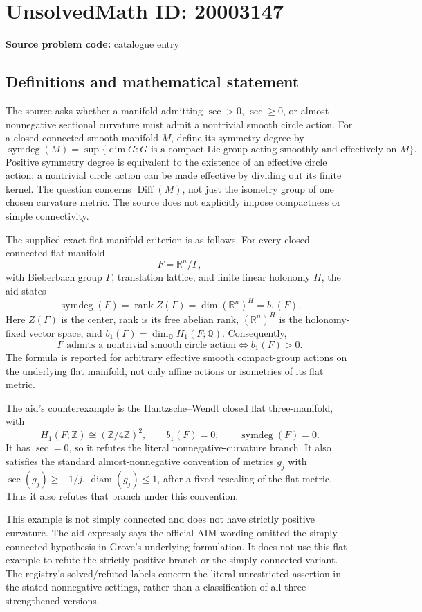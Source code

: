 \documentclass[11pt]{article}
\newcommand{\Z}{\mathbb{Z}}
\newcommand{\Q}{\mathbb{Q}}
\newcommand{\R}{\mathbb{R}}
\begin{document}
\section*{UnsolvedMath ID: 20003147}
\textbf{Source problem code:} catalogue entry
\subsection{Definitions and mathematical statement}
The source asks whether a manifold admitting \(\sec>0\), \(\sec\geq0\), or almost nonnegative sectional curvature must admit a nontrivial smooth circle action. For a closed connected smooth manifold \(M\), define its symmetry degree by
\[
 \operatorname{symdeg}(M)=\sup\{\dim G:G\text{ is a compact Lie group acting smoothly and effectively on }M\}.
\]
Positive symmetry degree is equivalent to the existence of an effective circle action; a nontrivial circle action can be made effective by dividing out its finite kernel. The question concerns \(\operatorname{Diff}(M)\), not just the isometry group of one chosen curvature metric. The source does not explicitly impose compactness or simple connectivity.

The supplied exact flat-manifold criterion is as follows. For every closed connected flat manifold
\[
 F=\R^n/\Gamma,
\]
with Bieberbach group \(\Gamma\), translation lattice, and finite linear holonomy \(H\), the aid states
\[
 \operatorname{symdeg}(F)
 =\operatorname{rank}Z(\Gamma)
 =\dim(\R^n)^H
 =b_1(F).
\]
Here \(Z(\Gamma)\) is the center, rank is its free abelian rank, \((\R^n)^H\) is the holonomy-fixed vector space, and \(b_1(F)=\dim_\Q H_1(F;\Q)\). Consequently,
\[
 F\text{ admits a nontrivial smooth circle action}
 \Longleftrightarrow b_1(F)>0.
\]
The formula is reported for arbitrary effective smooth compact-group actions on the underlying flat manifold, not only affine actions or isometries of its flat metric.

The aid's counterexample is the Hantzsche--Wendt closed flat three-manifold, with
\[
 H_1(F;\Z)\cong(\Z/4\Z)^2,
 \qquad b_1(F)=0,
 \qquad\operatorname{symdeg}(F)=0.
\]
It has \(\sec=0\), so it refutes the literal nonnegative-curvature branch. It also satisfies the standard almost-nonnegative convention of metrics \(g_j\) with \(\sec(g_j)\geq-1/j\), \(\operatorname{diam}(g_j)\leq1\), after a fixed rescaling of the flat metric. Thus it also refutes that branch under this convention.

This example is not simply connected and does not have strictly positive curvature. The aid expressly says the official AIM wording omitted the simply-connected hypothesis in Grove's underlying formulation. It does not use this flat example to refute the strictly positive branch or the simply connected variant. The registry's solved/refuted labels concern the literal unrestricted assertion in the stated nonnegative settings, rather than a classification of all three strengthened versions.
\end{document}
